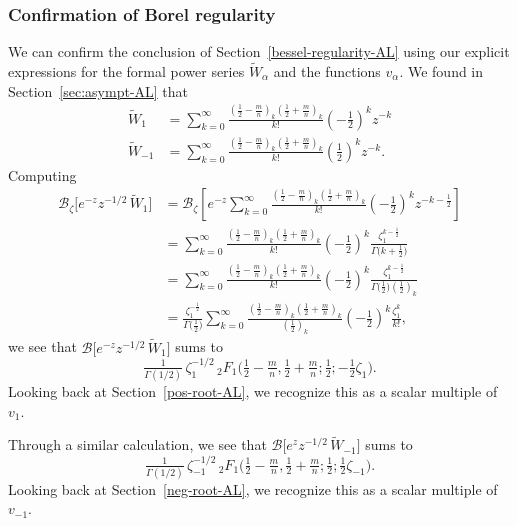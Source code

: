 \documentclass{article}
\theoremstyle{definition}
\newcommand{\borel}{\mathcal{B}}
\begin{document}
\subsubsection{Confirmation of Borel regularity}\label{confirmation-borel-regularity}
We can confirm the conclusion of Section~\ref{bessel-regularity-AL} using our explicit expressions for the formal power series $\tilde{W}_\alpha$ and the functions $v_\alpha$. We found in Section~\ref{sec:asympt-AL} that
\begin{align*}
\tilde{W}_1 & = \sum_{k = 0}^{\infty} \frac{\left(\tfrac{1}{2}-\tfrac{m}{n}\right)_k \left(\tfrac{1}{2}+\tfrac{m}{n}\right)_k}{k!} \left(-\frac{1}{2}\right)^k z^{-k} \\
\tilde{W}_{-1} & = \sum_{k = 0}^{\infty} \frac{\left(\tfrac{1}{2}-\tfrac{m}{n}\right)_k \left(\tfrac{1}{2}+\tfrac{m}{n}\right)_k}{k!} \left(\frac{1}{2}\right)^k z^{-k}.
\end{align*}
Computing
\begin{align*}
\borel_\zeta \big[ e^{-z} z^{-1/2}\,\tilde{W}_1 \big] & = \borel_\zeta \left[ e^{-z} \sum_{k = 0}^{\infty} \frac{\left(\tfrac{1}{2}-\tfrac{m}{n}\right)_k \left(\tfrac{1}{2}+\tfrac{m}{n}\right)_k}{k!} \left(-\frac{1}{2}\right)^k z^{-k-\frac{1}{2}} \right] \\
& = \sum_{k = 0}^{\infty} \frac{\left(\tfrac{1}{2}-\tfrac{m}{n}\right)_k \left(\tfrac{1}{2}+\tfrac{m}{n}\right)_k}{k!} \left(-\frac{1}{2}\right)^k \frac{\zeta_1^{k-\frac{1}{2}}}{\Gamma\big(k+\frac{1}{2}\big)} \\
& = \sum_{k = 0}^{\infty} \frac{\left(\tfrac{1}{2}-\tfrac{m}{n}\right)_k \left(\tfrac{1}{2}+\tfrac{m}{n}\right)_k}{k!} \left(-\frac{1}{2}\right)^k \frac{\zeta_1^{k-\frac{1}{2}}}{\Gamma\big(\frac{1}{2}\big) \left(\frac{1}{2}\right)_k} \\
& = \frac{\zeta_1^{-\frac{1}{2}}}{\Gamma\big(\frac{1}{2}\big)} \sum_{k = 0}^{\infty} \frac{\left(\tfrac{1}{2}-\tfrac{m}{n}\right)_k \left(\tfrac{1}{2}+\tfrac{m}{n}\right)_k}{\left(\frac{1}{2}\right)_k} \left(-\frac{1}{2}\right)^k \frac{\zeta_1^k}{k!},
\end{align*}
we see that $\borel\big[ e^{-z} z^{-1/2}\,\tilde{W}_1 \big]$ sums to
\[ \tfrac{1}{\Gamma(1/2)}\,\zeta_1^{-1/2}\,{}_2F_1\big(\tfrac{1}{2}-\tfrac{m}{n}, \tfrac{1}{2}+\tfrac{m}{n}; \tfrac{1}{2}; -\tfrac{1}{2}\zeta_1\big). \]
Looking back at Section~\ref{pos-root-AL}, we recognize this as a scalar multiple of $v_1$.


Through a similar calculation, we see that $\borel\big[ e^z z^{-1/2}\,\tilde{W}_{-1} \big]$ sums to
\[ \tfrac{1}{\Gamma(1/2)}\,\zeta_{-1}^{-1/2}\,{}_2F_1\big(\tfrac{1}{2}-\tfrac{m}{n}, \tfrac{1}{2}+\tfrac{m}{n}; \tfrac{1}{2}; \tfrac{1}{2}\zeta_{-1}\big). \]
Looking back at Section~\ref{neg-root-AL}, we recognize this as a scalar multiple of $v_{-1}$.
\end{document}
